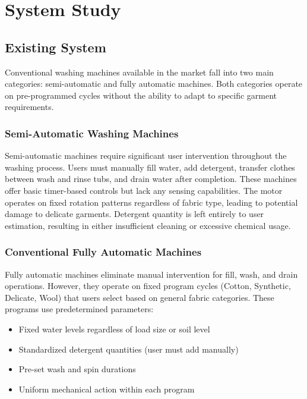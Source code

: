\chapter{System Study}

\section{Existing System}
Conventional washing machines available in the market fall into two main categories: semi-automatic and fully automatic machines. Both categories operate on pre-programmed cycles without the ability to adapt to specific garment requirements.

\subsection{Semi-Automatic Washing Machines}
Semi-automatic machines require significant user intervention throughout the washing process. Users must manually fill water, add detergent, transfer clothes between wash and rinse tubs, and drain water after completion. These machines offer basic timer-based controls but lack any sensing capabilities. The motor operates on fixed rotation patterns regardless of fabric type, leading to potential damage to delicate garments. Detergent quantity is left entirely to user estimation, resulting in either insufficient cleaning or excessive chemical usage.


\subsection{Conventional Fully Automatic Machines}
Fully automatic machines eliminate manual intervention for fill, wash, and drain operations. However, they operate on fixed program cycles (Cotton, Synthetic, Delicate, Wool) that users select based on general fabric categories. These programs use predetermined parameters:
\begin{itemize}
    \item Fixed water levels regardless of load size or soil level
    \item Standardized detergent quantities (user must add manually)
    \item Pre-set wash and spin durations
    \item Uniform mechanical action within each program
\end{itemize}

